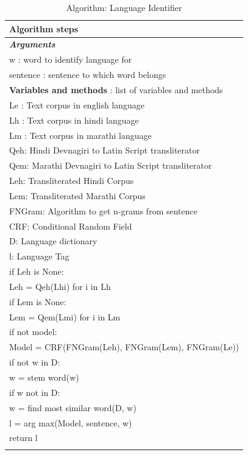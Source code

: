 \documentclass[12pt]{book}
\begin{document}
\begin{longtable}[c]{ |p{16cm}|  }
  \hline
  \textbf{Algorithm steps} \\
  \hline
  \endhead
  \textbf{\textit{Arguments}} \\
  \hline
  w : word to identify language for\\
  sentence : sentence to which word belongs\\
  \hline
  \textbf{Variables and methods} : list of variables and methods \\
  \hline
  Le : Text corpus in english language\\
  Lh : Text corpus in hindi language\\
  Lm : Text corpus in marathi language\\
  Qeh:  Hindi Devnagiri to Latin Script transliterator\\
  Qem:  Marathi Devnagiri to Latin Script transliterator\\
  Leh:  Transliterated Hindi Corpus\\
  Lem:  Transliterated Marathi Corpus\\
  FNGram:  Algorithm to get n-grams from sentence\\
  CRF:  Conditional Random Field\\
  D:  Language dictionary\\
  l:  Language Tag\\
  \hline
  if Leh is None:\\
  \hspace{4em}Leh = Qeh(Lh{i}) for i in Lh\\
  if Lem is None:\\
  \hspace{4em} Lem = Qem(Lm{i}) for i in Lm\\
    
  if not model:\\
  \hspace{4em}Model = CRF(FNGram(Leh), FNGram(Lem), FNGram(Le))\\
  \hspace{4em}if not w in D: \\
  \hspace{8em}w = stem word(w)\\
  \hspace{12em}if w not in D:\\
  \hspace{16em}w = find most similar word(D, w)\\
  l = arg max(Model, sentence, w)\\
  return l\\
  \hline
  \caption{ Algorithm: Language Identifier }\label{tab:tab_language_identifier}\\
\end{longtable}
\end{document}
